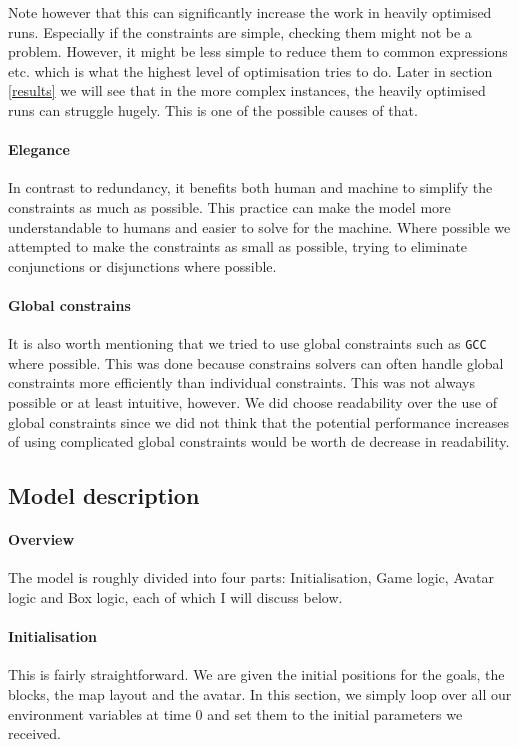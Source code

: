 \documentclass[british]{article}
\newcommand{\code}[1]{\texttt{#1}}
\begin{document}
	Note however that this can significantly increase the work in heavily optimised runs. Especially if the constraints are simple, checking them might not be a problem. However, it might be less simple to reduce them to common expressions etc. which is what the highest level of optimisation tries to do. Later in section \ref{results} we will see that in the more complex instances, the heavily optimised runs can struggle hugely. This is one of the possible causes of that. 
	
	\paragraph{Elegance} In contrast to redundancy, it benefits both human and machine to simplify the constraints as much as possible. This practice can make the model more understandable to humans and easier to solve for the machine. Where possible we attempted to make the constraints as small as possible, trying to eliminate conjunctions or disjunctions where possible. 
	
	\paragraph{Global constrains} It is also worth mentioning that we tried to use global constraints such as \code{GCC} where possible. This was done because constrains solvers can often handle global constraints more efficiently than individual constraints. This was not always possible or at least intuitive, however. We did choose readability over the use of global constraints since we did not think that the potential performance increases of using complicated global constraints would be worth de decrease in readability.
	
	\subsection{Model description}
	\paragraph{Overview} The model is roughly divided into four parts: Initialisation, Game logic, Avatar logic and Box logic, each of which I will discuss below. 
	
	\paragraph{Initialisation} This is fairly straightforward. We are given the initial positions for the goals, the blocks, the map layout and the avatar. In this section, we simply loop over all our environment variables at time 0 and set them to the initial parameters we received. 
	
\end{document}
